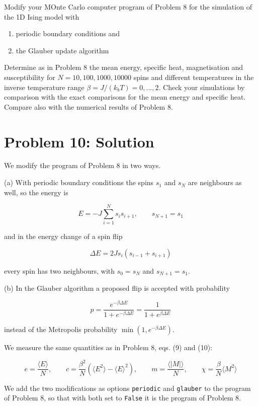 \documentclass[11pt]{article}
\providecommand{\tightlist}{%
      \setlength{\itemsep}{0pt}\setlength{\parskip}{0pt}}
\begin{document}
Modify your MOnte Carlo computer program of Problem 8 for the simulation
of the 1D Ising model with

\begin{enumerate}
\def\labelenumi{(\alph{enumi})}
\tightlist
\item
  periodic boundary conditions and
\item
  the Glauber update algorithm
\end{enumerate}

Determine as in Problem 8 the mean energy, specific heat, magnetisation
and susceptibility for \(N=10,100,1000,10000\) spins and different
temperatures in the inverse temperature range
\(\beta = J/(k_bT)=0,...,2\). Check your simulations by comparison with
the exact comparisons for the mean energy and specific heat. Compare
also with the numerical results of Problem 8.

    \section*{Problem 10: Solution}\label{problem-10-solution}

    We modify the program of Problem 8 in two ways.

(a) With periodic boundary conditions the spins \(s_1\) and \(s_N\) are
neighbours as well, so the energy is

\[
E=-J\sum_{i=1}^{N}s_is_{i+1}, \qquad s_{N+1}=s_1 \tag{4}
\]

and in the energy change of a spin flip

\[
\Delta E=2Js_i(s_{i-1}+s_{i+1}) \tag{5}
\]

every spin has two neighbours, with \(s_0=s_N\) and \(s_{N+1}=s_1\).

(b) In the Glauber algorithm a proposed flip is accepted with probability

\[
p=\frac{e^{-\beta\Delta E}}{1+e^{-\beta\Delta E}}=\frac{1}{1+e^{\beta\Delta E}} \tag{6}
\]

instead of the Metropolis probability \(\min(1,e^{-\beta\Delta E})\).

We measure the same quantities as in Problem 8, eqs. (9) and (10):

\[
e=\frac{\langle E\rangle}{N}, \qquad c=\frac{\beta^2}{N}\left(\langle E^2\rangle-\langle E\rangle^2\right), \qquad m=\frac{\langle |M|\rangle}{N}, \qquad \chi=\frac{\beta}{N}\langle M^2\rangle \tag{7}
\]

We add the two modifications as options \texttt{periodic} and
\texttt{glauber} to the program of Problem 8, so that with both set to
\texttt{False} it is the program of Problem 8.
\end{document}
